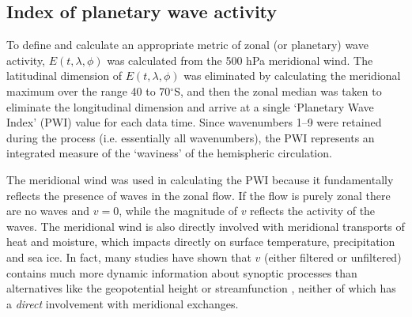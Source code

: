 \subsection{Index of planetary wave activity}

To define and calculate an appropriate metric of zonal (or planetary) wave activity, $E(t,\lambda,\phi)$ was calculated from the 500 hPa meridional wind. The latitudinal dimension of $E(t,\lambda,\phi)$ was eliminated by calculating the meridional maximum over the range 40 to 70$^{\circ}$S, and then the zonal median was taken to eliminate the longitudinal dimension and arrive at a single `Planetary Wave Index' (PWI) value for each data time. Since wavenumbers 1--9 were retained during the process (i.e. essentially all wavenumbers), the PWI represents an integrated measure of the `waviness' of the hemispheric circulation.

The meridional wind was used in calculating the PWI because it fundamentally reflects the presence of waves in the zonal flow. If the flow is purely zonal there are no waves and $v = 0$, while the magnitude of $v$ reflects the activity of the waves. The meridional wind is also directly involved with meridional transports of heat and moisture, which impacts directly on surface temperature, precipitation and sea ice. In fact, many studies have shown that $v$ (either filtered or unfiltered) contains much more dynamic information about synoptic processes than alternatives like the geopotential height or streamfunction \citep[e.g.][]{Berbery1996,Hoskins2005,Petoukhov2013}, neither of which has a \textit{direct} involvement with meridional exchanges. 

